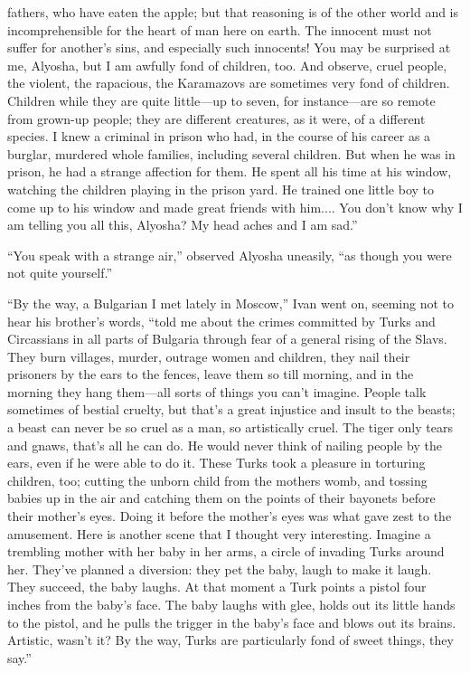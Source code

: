 fathers, who have eaten the apple; but that reasoning is of the other
world and is incomprehensible for the heart of man here on earth. The
innocent must not suffer for another's sins, and especially such
innocents! You may be surprised at me, Alyosha, but I am awfully fond
of children, too. And observe, cruel people, the violent, the
rapacious, the Karamazovs are sometimes very fond of children.
Children while they are quite lit\-tle---up to seven, for
in\-stance---are so remote from grown-up people; they are different
creatures, as it were, of a different species. I knew a criminal in
prison who had, in the course of his career as a burglar, murdered
whole families, including several children. But when he was in prison,
he had a strange affection for them. He spent all his time at his
window, watching the children playing in the prison yard. He trained
one little boy to come up to his window and made great friends with
him.... You don't know why I am telling you all this, Alyosha? My head
aches and I am sad.''

``You speak with a strange air,'' observed Alyosha uneasily, ``as
though you were not quite yourself.''

``By the way, a Bulgarian I met lately in Moscow,'' Ivan went on,
seeming not to hear his brother's words, ``told me about the crimes
committed by Turks and Circassians in all parts of Bulgaria through
fear of a general rising of the Slavs. They burn villages, murder,
outrage women and children, they nail their prisoners by the ears to
the fences, leave them so till morning, and in the morning they hang
them---all sorts of things you can't imagine. People talk sometimes of
bestial cruelty, but that's a great injustice and insult to the
beasts; a beast can never be so cruel as a man, so artistically cruel.
The tiger only  tears and gnaws, that's all he can do. He
would never think of nailing people by the ears, even if he were able
to do it. These Turks took a pleasure in torturing children, too;
cutting the unborn child from the mothers womb, and tossing babies
up in the air and catching them on the points of their bayonets before
their mother's eyes. Doing it before the mother's eyes was what gave
zest to the amusement. Here is another scene that I thought very
interesting. Imagine a trembling mother with her baby in her arms, a
circle of invading Turks around her. They've planned a diversion: they
pet the baby, laugh to make it laugh. They succeed, the baby laughs.
At that moment a Turk points a pistol four inches from the baby's
face. The baby laughs with glee, holds out its little hands to the
pistol, and he pulls the trigger in the baby's face and blows out its
brains. Artistic, wasn't it? By the way, Turks are particularly fond
of sweet things, they say.''

